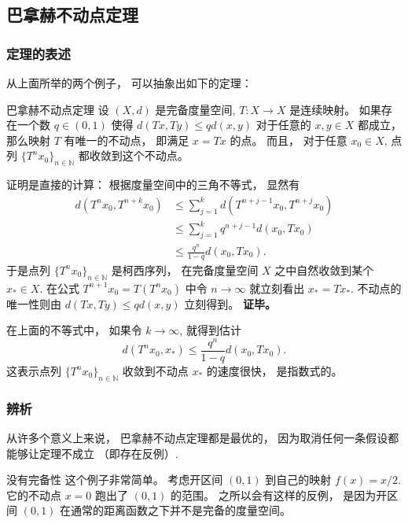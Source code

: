 \subsection{巴拿赫不动点定理}
\subsubsection{定理的表述}
从上面所举的两个例子， 可以抽象出如下的定理：
\begin{theorem}{巴拿赫不动点定理}
设 $(X,d)$ 是完备度量空间, $T:X\to X$ 是连续映射。 如果存在一个数 $q\in(0,1)$ 使得 $d(Tx,Ty)\leq qd(x,y)$ 对于任意的 $x,y\in X$ 都成立， 那么映射 $T$ 有唯一的不动点， 即满足 $x=Tx$ 的点。 而且， 对于任意 $x_0\in X$, 点列 $\{T^nx_0\}_{n\in\mathbb{N}}$ 都收敛到这个不动点。
\end{theorem}
证明是直接的计算： 根据度量空间中的三角不等式， 显然有
$$
\begin{aligned}
d(T^nx_0,T^{n+k}x_0)
&\leq \sum_{j=1}^k d(T^{n+j-1}x_0,T^{n+j}x_0)\\
&\leq \sum_{j=1}^k q^{n+j-1}d(x_0,Tx_0)\\
&\leq \frac{q^n}{1-q}d(x_0,Tx_0).
\end{aligned}
$$
于是点列 $\{T^nx_0\}_{n\in\mathbb{N}}$ 是柯西序列， 在完备度量空间 $X$ 之中自然收敛到某个 $x_*\in X$. 在公式 $T^{n+1}x_0=T(T^nx_0)$ 中令 $n\to\infty$ 就立刻看出 $x_*=Tx_*$. 不动点的唯一性则由 $d(Tx,Ty)\leq qd(x,y)$ 立刻得到。 \textbf{证毕。}

在上面的不等式中， 如果令 $k\to\infty$, 就得到估计
$$
d(T^nx_0,x_*)\leq\frac{q^n}{1-q}d(x_0,Tx_0).
$$
这表示点列 $\{T^nx_0\}_{n\in\mathbb{N}}$ 收敛到不动点 $x_*$ 的速度很快， 是指数式的。

\subsubsection{辨析}
从许多个意义上来说， 巴拿赫不动点定理都是最优的， 因为取消任何一条假设都能够让定理不成立 （即存在反例）.

\begin{example}{没有完备性}
这个例子非常简单。 考虑开区间 $(0,1)$ 到自己的映射 $f(x)=x/2$. 它的不动点 $x=0$ 跑出了 $(0,1)$ 的范围。 之所以会有这样的反例， 是因为开区间 $(0,1)$ 在通常的距离函数之下并不是完备的度量空间。
\end{example}


